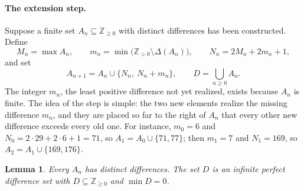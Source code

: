 \documentclass[11pt]{article}
\theoremstyle{plain}
\newtheorem{lemma}[theorem]{Lemma}
\theoremstyle{definition}
\newcommand{\Z}{\mathbb{Z}}
\begin{document}
\paragraph{The extension step.}
Suppose a finite set $A_n\subseteq\Z_{\geq0}$ with distinct differences
has been constructed.  Define
\begin{equation}\label{eq:parameters}
 M_n=\max A_n,\qquad
 m_n=\min\bigl(\Z_{>0}\setminus\Delta(A_n)\bigr),\qquad
 N_n=2M_n+2m_n+1,
\end{equation}
and set
\begin{equation}\label{eq:recursion}
 A_{n+1}=A_n\cup\{N_n,\ N_n+m_n\},\qquad
 D=\bigcup_{n\geq0}A_n.
\end{equation}
The integer $m_n$, the least positive difference not yet realized,
exists because $A_n$ is finite.  The idea of the step is simple: the two
new elements realize the missing difference $m_n$, and they are placed
so far to the right of $A_n$ that every other new difference exceeds
every old one.  For instance, $m_0=6$ and $N_0=2\cdot29+2\cdot6+1=71$,
so $A_1=A_0\cup\{71,77\}$; then $m_1=7$ and $N_1=169$, so
$A_2=A_1\cup\{169,176\}$.
\begin{lemma}\label{lem:diff}
Every $A_n$ has distinct differences.  The set $D$ is an infinite
perfect difference set with $D\subseteq\Z_{\geq0}$ and $\min D=0$.
\end{lemma}
\end{document}
